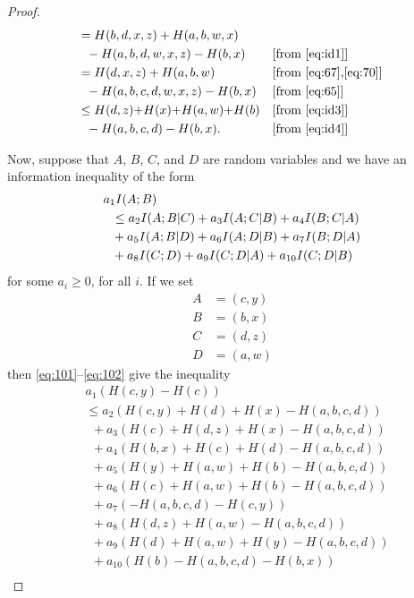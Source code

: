 \documentclass[10pt,journal]{IEEEtran}
\begin{document}
\begin{proof}
\begin{align}
             &\ \ = H(b,d,x,z) + H(a,b,w,x)\notag\\
             &\ \ \ \  - H(a,b,d,w,x,z) - H(b,x)    & & [\mbox{from \eqref{eq:id1}}] \notag\\
             &\ \ = H(d,x,z) + H(a,b,w)             & & [\mbox{from \eqref{eq:67},\eqref{eq:70}}]\notag\\
             &\ \ \ \  - H(a,b,c,d,w,x,z) - H(b,x)  & & [\mbox{from \eqref{eq:65}}]\notag\\
             &\ \ \le H(d,z) {+} H(x) {+} H(a,w) {+} H(b) & & [\mbox{from \eqref{eq:id3}}] \notag\\
             &\ \ \ \  - H(a,b,c,d) - H(b,x).       & & [\mbox{from \eqref{eq:id4}}]  \label{eq:102}
\end{align}
%

Now, suppose that $A$, $B$, $C$, and $D$ are  random variables and
we have an information inequality of the form
%
\begin{align}
&a_1 I(A;B) \notag\\
&\ \ \le a_2 I(A;B|C)
+ a_3 I(A;C|B)
+ a_4 I(B;C|A)\notag\\
&\ \ + a_5 I(A;B|D)
+ a_6 I(A;D|B)
+ a_7 I(B;D|A)\notag\\
&\ \ + a_8 I(C;D)
+ a_9 I(C;D|A)
+ a_{10} I(C;D|B)
\label{eq:105}
\end{align}
%
for some $a_i \ge 0$, for all $i$.
If we set
%
\begin{align*}
    A &= (c,y)\\
    B &= (b,x)\\
    C &= (d,z)\\
    D &= (a,w)
\end{align*}
%
then
\eqref{eq:101}--\eqref{eq:102}
give the inequality
%
\begin{align*}
&a_1 ( H(c,y) - H(c) ) \\
&\le
a_2 ( H(c,y) + H(d) + H(x) - H(a,b,c,d) ) \\
&\ \ + a_3 ( H(c) + H(d,z) + H(x) - H(a,b,c,d) ) \\
&\ \ + a_4 ( H(b,x) + H(c) + H(d) - H(a,b,c,d) ) \\
&\ \ + a_5 ( H(y) + H(a,w) + H(b) - H(a,b,c,d) ) \\
&\ \ + a_6 ( H(c) + H(a,w) + H(b) - H(a,b,c,d) ) \\
&\ \ + a_7 ( - H(a,b,c,d) - H(c,y) ) \\
&\ \ + a_8 ( H(d,z) + H(a,w) - H(a,b,c,d) ) \\
&\ \ + a_9 ( H(d) + H(a,w) + H(y) - H(a,b,c,d) ) \\
&\ \ + a_{10} ( H(b) - H(a,b,c,d) - H(b,x) ) \\

\end{align*}
\end{proof}
\end{document}
